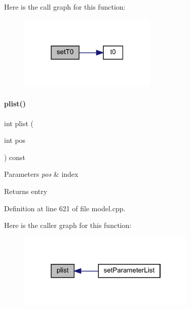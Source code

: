 Here is the call graph for this function\+:
\nopagebreak
\begin{figure}[H]
\begin{center}
\leavevmode
\includegraphics[width=186pt]{classamici_1_1_model_aaf5053fde7e205c89d89c000a7693987_cgraph}
\end{center}
\end{figure}
\mbox{\label{classamici_1_1_model_a6ac0de1b7dfddbb4a480657f62573563}} 
\paragraph{\texorpdfstring{plist()}{plist()}}
{\footnotesize\ttfamily int plist (\begin{DoxyParamCaption}\item[{int}]{pos }\end{DoxyParamCaption}) const}


\begin{DoxyParams}{Parameters}
{\em pos} & index \\
\hline
\end{DoxyParams}
\begin{DoxyReturn}{Returns}
entry 
\end{DoxyReturn}


Definition at line 621 of file model.\+cpp.

Here is the caller graph for this function\+:
\nopagebreak
\begin{figure}[H]
\begin{center}
\leavevmode
\includegraphics[width=241pt]{classamici_1_1_model_a6ac0de1b7dfddbb4a480657f62573563_icgraph}
\end{center}
\end{figure}
\mbox{\label{classamici_1_1_model_a7e63009c65fc1361cc5a6e1fc3d5ff1a}} 
